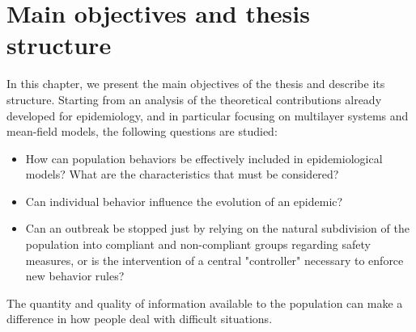 
\chapter{Main objectives and thesis structure}

In this chapter, we present the main objectives of the thesis and describe its structure. Starting from an analysis of the theoretical contributions already developed for epidemiology, and in particular focusing on multilayer systems and mean-field models, the following questions are studied:

\begin{itemize}
	\item How can population behaviors be effectively included in epidemiological models? What are the characteristics that must be considered?
	\item Can individual behavior influence the evolution of an epidemic?
	\item Can an outbreak be stopped just  by relying on the natural subdivision of the population into compliant and non-compliant groups regarding safety measures, or is the intervention of a central "controller" necessary to enforce new behavior rules?
\end{itemize}

The quantity and quality of information available to the population can make a difference in how people deal with difficult situations.


